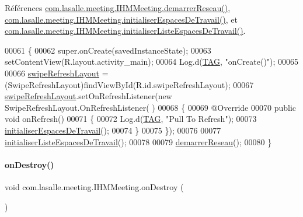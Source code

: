 Références \hyperlink{_i_h_m_meeting_8java_source_l00082}{com.\+lasalle.\+meeting.\+I\+H\+M\+Meeting.\+demarrer\+Reseau()}, \hyperlink{_i_h_m_meeting_8java_source_l00171}{com.\+lasalle.\+meeting.\+I\+H\+M\+Meeting.\+initialiser\+Espaces\+De\+Travail()}, et \hyperlink{_i_h_m_meeting_8java_source_l00263}{com.\+lasalle.\+meeting.\+I\+H\+M\+Meeting.\+initialiser\+Liste\+Espaces\+De\+Travail()}.


\begin{DoxyCode}
00061     \{
00062         super.onCreate(savedInstanceState);
00063         setContentView(R.layout.activity\_main);
00064         Log.d(\hyperlink{classcom_1_1lasalle_1_1meeting_1_1_i_h_m_meeting_a239eafcb0ccc896bdba538d1c0f08e65}{TAG}, \textcolor{stringliteral}{"onCreate()"});
00065 
00066         \hyperlink{classcom_1_1lasalle_1_1meeting_1_1_i_h_m_meeting_a64f84fda5f7f595cf0c75ccfb189af8d}{swipeRefreshLayout} = (SwipeRefreshLayout)findViewById(R.id.swipeRefreshLayout);
00067         \hyperlink{classcom_1_1lasalle_1_1meeting_1_1_i_h_m_meeting_a64f84fda5f7f595cf0c75ccfb189af8d}{swipeRefreshLayout}.setOnRefreshListener(\textcolor{keyword}{new} SwipeRefreshLayout.OnRefreshListener(
      )
00068         \{
00069             @Override
00070             \textcolor{keyword}{public} \textcolor{keywordtype}{void} onRefresh()
00071             \{
00072                 Log.d(\hyperlink{classcom_1_1lasalle_1_1meeting_1_1_i_h_m_meeting_a239eafcb0ccc896bdba538d1c0f08e65}{TAG}, \textcolor{stringliteral}{"Pull To Refresh"});
00073                 \hyperlink{classcom_1_1lasalle_1_1meeting_1_1_i_h_m_meeting_ad4660f416b16b6df0f96d58f4c36b6f6}{initialiserEspacesDeTravail}();
00074             \}
00075         \});
00076 
00077         \hyperlink{classcom_1_1lasalle_1_1meeting_1_1_i_h_m_meeting_a6624feade3dc156bc7eb40f79cb47267}{initialiserListeEspacesDeTravail}();
00078 
00079         \hyperlink{classcom_1_1lasalle_1_1meeting_1_1_i_h_m_meeting_ab9ef4bd3436aa480f92a5b1922fd6666}{demarrerReseau}();
00080     \}
\end{DoxyCode}
\mbox{\label{classcom_1_1lasalle_1_1meeting_1_1_i_h_m_meeting_a949a2219b9b5c29f7c1a9855a782a676}} 
\paragraph{\texorpdfstring{on\+Destroy()}{onDestroy()}}
{\footnotesize\ttfamily void com.\+lasalle.\+meeting.\+I\+H\+M\+Meeting.\+on\+Destroy (\begin{DoxyParamCaption}{ }\end{DoxyParamCaption})\hspace{0.3cm}{\ttfamily [protected]}}



